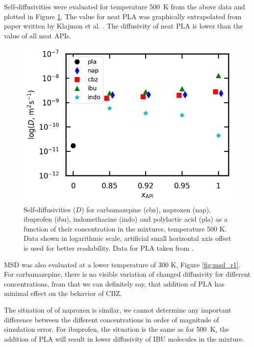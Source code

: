 Self-diffusivities were evaluated for temperature 500~K from the above data and plotted in Figure \ref{fig:d}. The value for neat PLA was graphically extrapolated from paper written by Klajmon et al. \cite{klajmon_glass_2023}. The diffusivity of neat PLA is lower than the value of all neat APIs. 
\begin{figure}[htb!]
	\centering
	\includegraphics[width=0.8\linewidth]{img/d.png} 
	\caption{Self-diffusivities ($D$) for carbamazepine (cbz), naproxen (nap), ibuprofen (ibu), indomethacine (indo) and polylactic acid (pla) as a function of their concentration in the mixtures, temperature 500 K. Data shown in logarithmic scale, artificial small horizontal axis offset is used for better readability. Data for PLA taken from \cite{klajmon_glass_2023}.}
	\label{fig:d}    
\end{figure}  

\newpage
MSD was also evaluated at a lower temperature of 300 K, Figure \ref{fig:msd_r1}. For carbamazepine, there is no visible variation of changed diffusivity for different concentrations, from that we can definitely say, that addition of PLA has minimal effect on the behavior of CBZ. 

The situation of of naproxen is similar, we cannot determine any important difference between the different concentrations in order of magnitude of simulation error. For ibuprofen, the situation is the same as for 500~K, the addition of PLA will result in lower diffusivity of IBU molecules in the mixture. 

